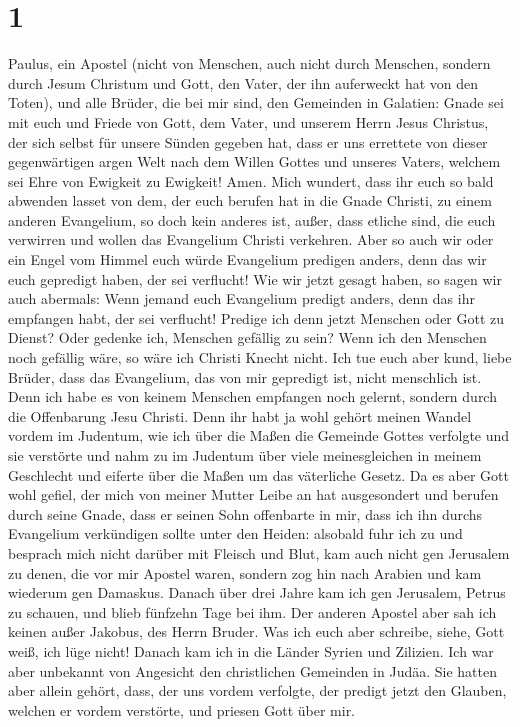 \hypertarget{section}{%
\section{1}\label{section}}

 Paulus, ein Apostel (nicht von Menschen, auch nicht durch
Menschen, sondern durch Jesum Christum und Gott, den Vater, der ihn
auferweckt hat von den Toten),  und alle Brüder, die bei
mir sind, den Gemeinden in Galatien:  Gnade sei mit euch
und Friede von Gott, dem Vater, und unserem Herrn Jesus Christus,
 der sich selbst für unsere Sünden gegeben hat, dass er
uns errettete von dieser gegenwärtigen argen Welt nach dem Willen Gottes
und unseres Vaters,  welchem sei Ehre von Ewigkeit zu
Ewigkeit! Amen.  Mich wundert, dass ihr euch so bald
abwenden lasset von dem, der euch berufen hat in die Gnade Christi, zu
einem anderen Evangelium,  so doch kein anderes ist,
außer, dass etliche sind, die euch verwirren und wollen das Evangelium
Christi verkehren.  Aber so auch wir oder ein Engel vom
Himmel euch würde Evangelium predigen anders, denn das wir euch
gepredigt haben, der sei verflucht!  Wie wir jetzt gesagt
haben, so sagen wir auch abermals: Wenn jemand euch Evangelium predigt
anders, denn das ihr empfangen habt, der sei verflucht! 
Predige ich denn jetzt Menschen oder Gott zu Dienst? Oder gedenke ich,
Menschen gefällig zu sein? Wenn ich den Menschen noch gefällig wäre, so
wäre ich Christi Knecht nicht.  Ich tue euch aber kund,
liebe Brüder, dass das Evangelium, das von mir gepredigt ist, nicht
menschlich ist.  Denn ich habe es von keinem Menschen
empfangen noch gelernt, sondern durch die Offenbarung Jesu Christi.
 Denn ihr habt ja wohl gehört meinen Wandel vordem im
Judentum, wie ich über die Maßen die Gemeinde Gottes verfolgte und sie
verstörte  und nahm zu im Judentum über viele
meinesgleichen in meinem Geschlecht und eiferte über die Maßen um das
väterliche Gesetz.  Da es aber Gott wohl gefiel, der mich
von meiner Mutter Leibe an hat ausgesondert und berufen durch seine
Gnade,  dass er seinen Sohn offenbarte in mir, dass ich
ihn durchs Evangelium verkündigen sollte unter den Heiden: alsobald fuhr
ich zu und besprach mich nicht darüber mit Fleisch und Blut,
 kam auch nicht gen Jerusalem zu denen, die vor mir
Apostel waren, sondern zog hin nach Arabien und kam wiederum gen
Damaskus.  Danach über drei Jahre kam ich gen Jerusalem,
Petrus zu schauen, und blieb fünfzehn Tage bei ihm.  Der
anderen Apostel aber sah ich keinen außer Jakobus, des Herrn Bruder.
 Was ich euch aber schreibe, siehe, Gott weiß, ich lüge
nicht!  Danach kam ich in die Länder Syrien und Zilizien.
 Ich war aber unbekannt von Angesicht den christlichen
Gemeinden in Judäa.  Sie hatten aber allein gehört, dass,
der uns vordem verfolgte, der predigt jetzt den Glauben, welchen er
vordem verstörte,  und priesen Gott über mir.

